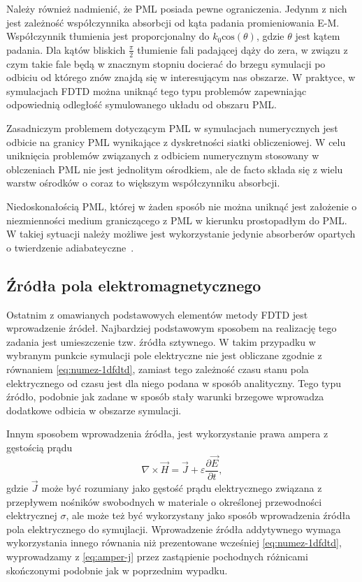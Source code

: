 Należy również nadmienić, że PML posiada pewne ograniczenia. Jedynm z nich jest zależność współczynnika absorbcji od kąta padania promieniowania E-M. Współczynnik tłumienia jest proporcjonalny do $k_0 \textrm{cos}(\theta)$, gdzie $\theta$ jest kątem padania. Dla kątów bliskich $\frac{\pi}{2}$ tłumienie fali padającej dąży do zera, w związu z czym takie fale będą w znacznym stopniu docierać do brzegu symulacji po odbiciu od którego znów znajdą się w interesującym nas obszarze. W praktyce, w symulacjach FDTD można uniknąć tego typu problemów zapewniając odpowiednią odległość symulowanego układu od obszaru PML.

Zasadniczym problemem dotyczącym PML w symulacjach numerycznych jest odbicie na granicy PML wynikające z dyskretności siatki obliczeniowej. W celu uniknięcia problemów związanych z odbiciem numerycznym stosowany w oblczeniach PML nie jest jednolitym ośrodkiem, ale de facto składa się z wielu warstw ośrodków o coraz to większym współczynniku absorbcji.

Niedoskonałością PML, której w żaden sposób nie można uniknąć jest założenie o niezmienności medium graniczącego z PML w kierunku prostopadłym do PML. W takiej sytuacji należy możliwe jest wykorzystanie jedynie absorberów opartych o twierdzenie adiabateyczne~\cite{oskooi2008failure}.




\subsection{Źródła pola elektromagnetycznego}
Ostatnim z omawianych podstawowych elementów metody FDTD jest wprowadzenie źródeł. Najbardziej podstawowym sposobem na realizację tego zadania jest umieszczenie tzw. źródła sztywnego. W takim przypadku w wybranym punkcie symulacji pole elektryczne nie jest obliczane zgodnie z równaniem \ref{eq:numez-1dfdtd}, zamiast tego zależność czasu stanu pola elektrycznego od czasu jest dla niego podana w sposób analityczny. Tego typu źródło, podobnie jak zadane w sposób stały warunki brzegowe wprowadza dodatkowe odbicia w obszarze symulacji.

Innym sposobem wprowadzenia źródła, jest wykorzystanie prawa ampera z gęstością prądu
\begin{equation}
\nabla \times \vec{H} = \vec{J} + \varepsilon \frac{\partial \vec{E}}{\partial t},
\label{eq:amper-j}
\end{equation}
gdzie $\vec{J}$ może być rozumiany jako gęstość prądu elektrycznego związana z przepływem nośników swobodnych w materiale o określonej przewodności elektrycznej $\sigma$, ale może też być wykorzystany jako sposób wprowadzenia źródła pola elektrycznego do symujlacji. Wprowadzenie źródła addytywnego wymaga wykorzystania innego równania niż prezentowane wcześniej \ref{eq:numez-1dfdtd}, wyprowadzamy z \ref{eq:amper-j} przez zastąpienie pochodnych różnicami skończonymi podobnie jak w poprzednim wypadku. 



